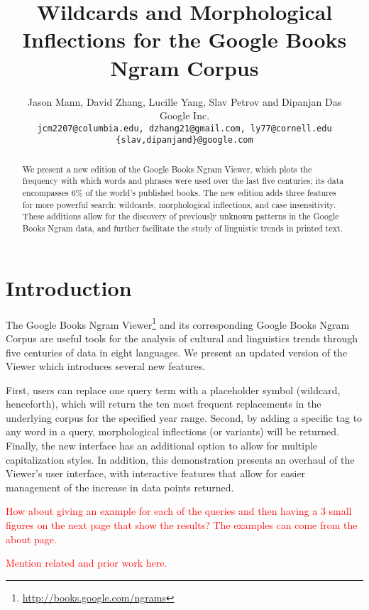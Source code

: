 \documentclass[11pt]{article}
\title{Wildcards and Morphological Inflections for the Google Books Ngram Corpus}
\author{Jason Mann, David Zhang, Lucille Yang, Slav Petrov and Dipanjan Das\\
	Google Inc. \\
	{\tt jcm2207@columbia.edu, dzhang21@gmail.com, ly77@cornell.edu}\\
	{\tt \{slav,dipanjand\}@google.com}}
\date{}
\begin{document}
\maketitle

\begin{abstract}

We present a new edition of the Google Books Ngram Viewer, which plots
the frequency with which words and phrases were used over the last five
centuries; its data encompasses 6\% of the world's published books.
The new edition adds three features for more powerful search: wildcards,
morphological inflections, and case insensitivity. These additions allow
for the discovery of previously unknown patterns in the Google Books Ngram data,
and further facilitate the study of linguistic trends in printed text.

\end{abstract}

\section{Introduction}

The Google Books Ngram Viewer\footnote{\url{http://books.google.com/ngrams}} and its corresponding Google Books Ngram Corpus \cite{lin2012syntactic} are useful tools for the analysis of cultural and linguistics trends through five centuries of data in eight languages. We present an updated version of the Viewer which introduces several new features. 

First, users can replace one query term with a placeholder symbol (wildcard, henceforth), which will return the ten most frequent replacements in the underlying corpus for the specified year range. Second, by adding a specific tag to any word in a query, morphological inflections (or variants) will be returned. Finally, the new interface has an additional option to allow for multiple capitalization styles. In addition, this demonstration presents an overhaul of the Viewer's user interface, with interactive features that allow for easier management of the increase in data points returned.

\vspace{1em}
\textcolor{red}{How about giving an example for each of the queries and then having a 3 small figures on the next page that show the results? The examples can come from the about page.}
\vspace{1em}

\vspace{1em}
\textcolor{red}{Mention related and prior work here.}
\vspace{1em}
\end{document}
